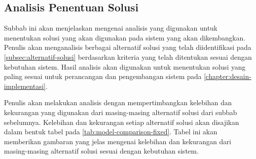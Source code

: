 \subsection{Analisis Penentuan Solusi}
\label{subsec:analisis-penentuan-solusi}

Subbab ini akan menjelaskan mengenai analisis yang digunakan untuk menentukan solusi yang akan digunakan pada sistem yang akan dikembangkan. Penulis akan menganalisis berbagai alternatif solusi yang telah diidentifikasi pada \autoref{subsec:alternatif-solusi} berdasarkan kriteria yang telah ditentukan sesuai dengan kebutuhan sistem. Hasil analisis akan digunakan untuk menentukan solusi yang paling sesuai untuk perancangan dan pengembangan sistem pada \autoref{chapter:desain-implementasi}.

Penulis akan melakukan analisis dengan mempertimbangkan kelebihan dan kekurangan yang digunakan dari masing-masing alternatif solusi dari subbab sebelumnya. Kelebihan dan kekurangan setiap alternatif solusi akan disajikan dalam bentuk tabel pada \autoref{tab:model-comparison-fixed}. Tabel ini akan memberikan gambaran yang jelas mengenai kelebihan dan kekurangan dari masing-masing alternatif solusi sesuai dengan kebutuhan sistem.

